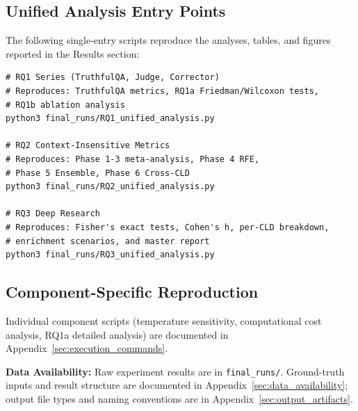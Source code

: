 \subsection{Unified Analysis Entry Points}
The following single-entry scripts reproduce the analyses, tables, and figures reported in the Results section:

\begin{verbatim}
# RQ1 Series (TruthfulQA, Judge, Corrector)
# Reproduces: TruthfulQA metrics, RQ1a Friedman/Wilcoxon tests,
# RQ1b ablation analysis
python3 final_runs/RQ1_unified_analysis.py

# RQ2 Context-Insensitive Metrics
# Reproduces: Phase 1-3 meta-analysis, Phase 4 RFE,
# Phase 5 Ensemble, Phase 6 Cross-CLD
python3 final_runs/RQ2_unified_analysis.py

# RQ3 Deep Research
# Reproduces: Fisher's exact tests, Cohen's h, per-CLD breakdown,
# enrichment scenarios, and master report
python3 final_runs/RQ3_unified_analysis.py
\end{verbatim}

\subsection{Component-Specific Reproduction}

Individual component scripts (temperature sensitivity, computational cost analysis, RQ1a detailed analysis) are documented in Appendix~\ref{sec:execution_commands}.

\textbf{Data Availability:} Raw experiment results are in \texttt{final\_runs/}. Ground-truth inputs and result structure are documented in Appendix~\ref{sec:data_availability}; output file types and naming conventions are in Appendix~\ref{sec:output_artifacts}.